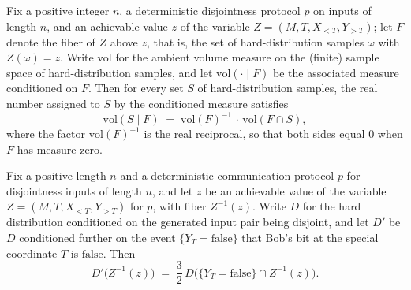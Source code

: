 \begin{theorem}
\label{CommunicationComplexity.Functions.Disjointness.RandomizedLowerBound.zFiberMeasure_real_apply}
\leanok
{}
Fix a positive integer $n$, a deterministic disjointness protocol $p$ on inputs of
length $n$, and an achievable value $z$ of the variable $Z = (M, T, X_{<T}, Y_{>T})$;
let $F$ denote the fiber of $Z$ above $z$, that is, the set of hard-distribution samples
$\omega$ with $Z(\omega) = z$. Write $\mathrm{vol}$ for the ambient volume measure on
the (finite) sample space of hard-distribution samples, and let $\mathrm{vol}(\cdot \mid
F)$ be the associated measure conditioned on $F$. Then for every set $S$ of
hard-distribution samples, the real number assigned to $S$ by the conditioned measure
satisfies
\[
\mathrm{vol}(S \mid F) \;=\; \mathrm{vol}(F)^{-1}\,\cdot\,\mathrm{vol}(F \cap S),
\]
where the factor $\mathrm{vol}(F)^{-1}$ is the real reciprocal, so that both sides equal
$0$ when $F$ has measure zero.
\end{theorem}

\begin{theorem}
\label{CommunicationComplexity.Functions.Disjointness.RandomizedLowerBound.disjointSpecialYFalseMeasure_measureReal_zVariable}
\leanok
{}
Fix a positive length $n$ and a deterministic communication protocol $p$ for
disjointness inputs of length $n$, and let $z$ be an achievable value of the variable
$Z=(M,T,X_{<T},Y_{>T})$ for $p$, with fiber $Z^{-1}(z)$. Write $D$ for the hard
distribution conditioned on the generated input pair being disjoint, and let $D'$ be $D$
conditioned further on the event $\{Y_T=\mathrm{false}\}$ that Bob's bit at the special
coordinate $T$ is $\mathrm{false}$. Then
\[
D'\big(Z^{-1}(z)\big) \;=\; \frac{3}{2}\, D\big(\{Y_T=\mathrm{false}\}\cap
Z^{-1}(z)\big).
\]
\end{theorem}

